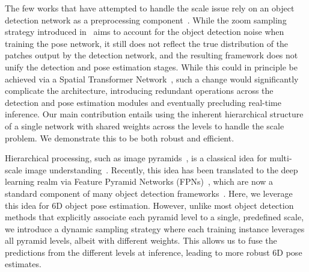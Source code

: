 The few works that have attempted to handle the scale issue rely on an object detection network as a preprocessing component~\cite{Li18a,Li19a,Chen19DLR}. While the zoom sampling strategy introduced in~\cite{Li19a} aims to account for the object detection noise when training the pose network, it still does not reflect the true distribution of the patches output by the detection network, and the resulting framework does not unify the detection and pose estimation stages.  While this could in principle be achieved via a Spatial Transformer Network~\cite{Jaderberg15}, such a change would significantly complicate the architecture, introducing redundant operations across the detection and pose estimation modules and eventually precluding real-time inference. Our main contribution entails using the inherent hierarchical structure of a single network with shared weights across the levels to handle the scale problem. We demonstrate this to be both robust and efficient.

Hierarchical processing, such as image pyramids~\cite{Bartoli08,Hu16,Jing18}, is a classical idea for multi-scale image understanding~\cite{Hu16a,Hu18d}. Recently, this idea has been translated to the deep learning realm via Feature Pyramid Networks (FPNs)~\cite{Lin17e}, which are now a standard component of many object detection frameworks~\cite{Lin17f,Tian19b,Zhang20d}. Here, we leverage this idea for 6D object pose estimation. However, unlike most object detection methods that explicitly associate each pyramid level to a single, predefined scale, we introduce a dynamic sampling strategy where each training instance leverages all pyramid levels, albeit with different weights. This allows us to fuse the predictions from the different levels at inference, leading to more robust 6D pose estimates.



